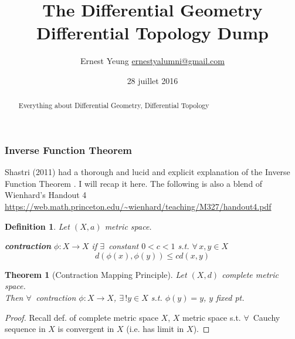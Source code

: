 \documentclass[10pt]{amsart}
\title{The Differential Geometry Differential Topology Dump}
\author{Ernest Yeung \href{mailto:ernestyalumni@gmail.com}{ernestyalumni@gmail.com}}
\date{28 juillet 2016}
\newtheorem{theorem}{Theorem}
\newtheorem{definition}{Definition}
\begin{document}

\maketitle



\begin{multicols*}{2}

  
\setcounter{tocdepth}{1}
\tableofcontents



\begin{abstract}
Everything about Differential Geometry, Differential Topology

\end{abstract}

\part{}


\section{Inverse Function Theorem}

Shastri (2011) had a thorough and lucid and explicit explanation of the Inverse Function Theorem \cite{AShastri2011}.  I will recap it here.  The following is also a blend of Wienhard's Handout 4 \url{https://web.math.princeton.edu/~wienhard/teaching/M327/handout4.pdf}

\begin{definition}
  Let $(X,a)$ metric space.  

\textbf{contraction} $\phi:X \to X$ if $\exists \, $ constant $0<c<1$ s.t. $\forall \, x,y \in X$
\[
d(\phi(x),\phi(y)) \leq cd(x,y)
\]
\end{definition}

\begin{theorem}[Contraction Mapping Principle]
  Let $(X,d)$ complete metric space.  \\
Then $\forall \, $ contraction $\phi:X\to X$, $\exists \, ! y\in X$ s.t. $\phi(y) = y$, $y$ \emph{fixed pt.}
\end{theorem}

\begin{proof}
  Recall def. of complete metric space $X$, $X$ metric space s.t. $\forall \, $ Cauchy sequence in $X$ is convergent in $X$ (i.e. has limit in $X$).  


\end{proof}
\end{multicols*}
\end{document}
